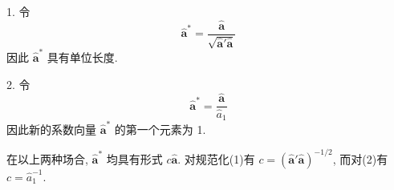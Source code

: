 1. 令
\label{eq:11-21}
\begin{equation}
\hat{\mathbf{a}}^*=\frac{\hat{\mathbf{a}}}{\sqrt{\hat{\mathbf{a}}'\hat{\mathbf{a}}}}
\tag{11-21}
\end{equation}
因此 $\hat{\mathbf{a}}^*$ 具有单位长度.

2. 令
\label{eq:11-22}
\begin{equation}
\hat{\mathbf{a}}^*=\frac{\hat{\mathbf{a}}}{\hat{a}_1}
\tag{11-22}
\end{equation}
因此新的系数向量 $\hat{\mathbf{a}}^*$ 的第一个元素为 1.

在以上两种场合, $\hat{\mathbf{a}}^*$ 均具有形式 $c\hat{\mathbf{a}}$. 对规范化(1)有 $c=(\hat{\mathbf{a}}'\hat{\mathbf{a}})^{-1/2}$, 而对(2)有 $c=\hat{a}_1^{-1}$.
